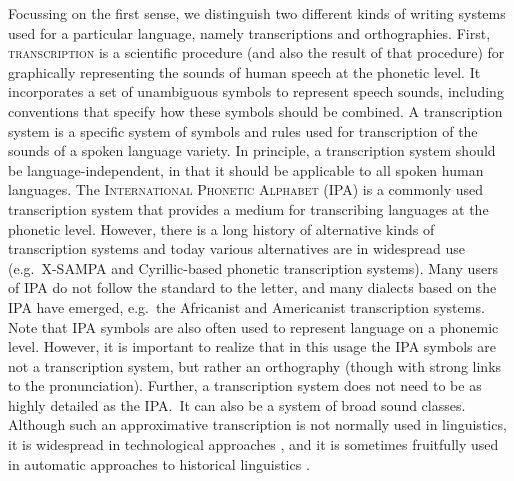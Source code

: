Focussing on the first sense, we distinguish two different kinds of 
writing systems used for a particular language, namely transcriptions and
orthographies. First, \textsc{transcription} is a scientific procedure (and also
the result of that procedure) for graphically representing the sounds of human
speech at the phonetic level. It incorporates a set of unambiguous symbols to
represent speech sounds, including conventions that specify how these symbols
should be combined. A transcription system is a specific system of symbols and
rules used for transcription of the sounds of a spoken language variety. In
principle, a transcription system should be language-independent, in that it
should be applicable to all spoken human languages. The \textsc{International
Phonetic Alphabet} (IPA) is a commonly used transcription system that provides a
medium for transcribing languages at the phonetic level. However, there is a
long history of alternative kinds of transcription systems
\citep[see][]{Kemp2006} and today various alternatives are in widespread use
(e.g.~X-SAMPA and Cyrillic-based phonetic transcription systems). Many
users of IPA do not follow the standard to the letter, and many dialects based
on the IPA have emerged, e.g.~the Africanist and Americanist transcription
systems. Note that IPA symbols are also often used to represent language on a
phonemic level. However, it is important to realize that in this usage the IPA
symbols are not a transcription system, but rather an orthography (though with
strong links to the pronunciation). Further, a transcription system does not
need to be as highly detailed as the IPA.\ It can also be a system of broad sound
classes. Although such an approximative transcription is not normally used in
linguistics, it is widespread in technological approaches
\citetext{\citealp[Soundex and variants, e.g.~][391--392]{Knuth1973};
\citealp{postel1969,Beider2008}}, and it is sometimes fruitfully used in
automatic approaches to historical linguistics
\citep{Dolgopolsky1986,List2012esslli,Brown2013}.

